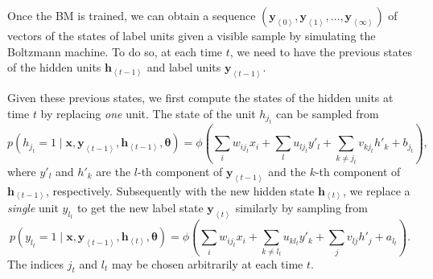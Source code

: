 \documentclass[dissertation,nocontribution,draft*]{aaltoseries}
\newcommand{\qt}[1]{\left<#1\right>}
\newcommand{\vect}[1]{\mathbf{#1}}
\newcommand{\vects}[1]{\boldsymbol{#1}}
\newcommand{\vh}[0]{\vect{h}}
\newcommand{\vx}[0]{\vect{x}}
\newcommand{\vy}[0]{\vect{y}}
\newcommand{\TT}[0]{{\vects{\theta}}}
\begin{document}
Once the BM is trained, we can obtain a sequence $\left(
\vy_{\qt{0}}, \vy_{\qt{1}}, \dots, \vy_{\qt{\infty}} \right)$ of
vectors of the states of label units given a visible sample
by simulating the Boltzmann machine.  To do so, at each time
$t$, we need to have the previous states of the hidden units
$\vh_{\qt{t-1}}$ and label units $\vy_{\qt{t-1}}$. 

Given these previous states, we first compute the states of
the hidden units at time $t$ by replacing \textit{one} unit.
The state of the unit $h_{j_t}$ can be sampled from
\[
p(h_{j_t} = 1 \mid \vx, \vy_{\qt{t-1}}, \vh_{\qt{t-1}}, \TT) = \phi\left( 
\sum_{i} w_{i{j_t}} x_{i} 
+ \sum_{l} u_{l{j_t}} y'_{l} 
+ \sum_{k \neq {j_t}} v_{k{j_t}} h'_k 
+ b_{j_t} \right),
\]
where $y'_l$ and $h'_k$ are the $l$-th component of
$\vy_{\qt{t-1}}$ and the $k$-th component of $\vh_{\qt{t-1}}$,
respectively. Subsequently with the new hidden state
$\vh_{\qt{t}}$, we replace a \textit{single} unit $y_{l_t}$ to
get the new label state $\vy_{\qt{t}}$ similarly by sampling
from
\[
p(y_{l_t} = 1 \mid \vx, \vy_{\qt{t-1}}, \vh_{\qt{t}}, \TT) = \phi\left( 
\sum_{i} w_{i{j_t}} x_{i} 
+ \sum_{k \neq l_t} u_{k{l_t}} y'_{k} 
+ \sum_{j} v_{lj} h'_j 
+ a_{l_t} \right).
\]
The indices $j_t$ and $l_t$ may be chosen arbitrarily at
each time $t$. 
\end{document}
